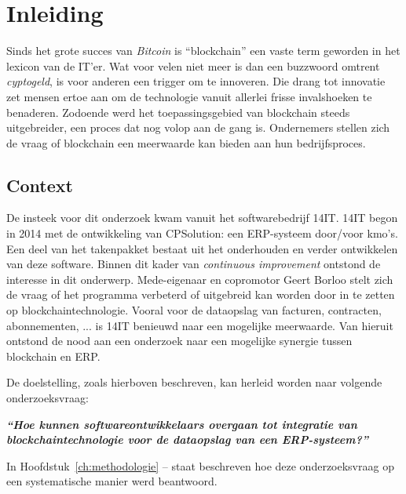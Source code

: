 
\chapter{Inleiding}
\label{ch:inleiding}

Sinds het grote succes van \textit{Bitcoin} is ``blockchain'' een vaste term geworden in het lexicon van de IT'er. Wat voor velen niet meer is dan een buzzwoord omtrent \textit{cyptogeld}, is voor anderen een trigger om te innoveren.
Die drang tot innovatie zet mensen ertoe aan om de technologie vanuit allerlei frisse invalshoeken te benaderen. Zodoende werd het toepassingsgebied van blockchain steeds uitgebreider, een proces dat nog volop aan de gang is. Ondernemers stellen zich de vraag of blockchain een meerwaarde kan bieden aan hun bedrijfsproces.

\section{Context}
\label{sec:context}

De insteek voor dit onderzoek kwam vanuit het softwarebedrijf 14IT. 14IT begon in 2014 met de ontwikkeling van CPSolution: een ERP-systeem door/voor kmo's. Een deel van het takenpakket bestaat uit het onderhouden en verder ontwikkelen van deze software. Binnen dit kader van \textit{continuous improvement} ontstond de interesse in dit onderwerp. Mede-eigenaar en copromotor Geert Borloo stelt zich de vraag of het programma verbeterd of uitgebreid kan worden door in te zetten op blockchaintechnologie. Vooral voor de dataopslag van facturen, contracten, abonnementen, ...  is 14IT benieuwd naar een mogelijke meerwaarde. Van hieruit ontstond de nood aan een onderzoek naar een mogelijke synergie tussen blockchain en ERP. 

\pagebreak

De doelstelling, zoals hierboven beschreven, kan herleid worden naar volgende onderzoeksvraag:

\begin{center}
	\textit{\textbf{``Hoe kunnen softwareontwikkelaars overgaan tot integratie van blockchaintechnologie voor de dataopslag van een ERP-systeem?''}}
\end{center}

In Hoofdstuk~\ref{ch:methodologie} --  staat beschreven hoe deze onderzoeksvraag op een systematische manier werd beantwoord.



